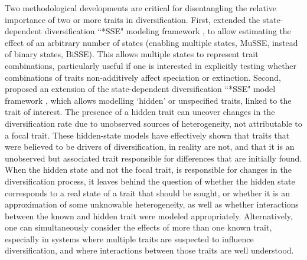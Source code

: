 Two methodological developments are critical for disentangling the relative importance of two or more traits in diversification.
First, \citet{fitzjohn_2012} extended the state-dependent diversification ``*SSE" modeling framework \citep{maddison2007}, to allow estimating the effect of an arbitrary number of states (enabling multiple states, MuSSE, instead of binary states, BiSSE).
This allows multiple states to represent trait combinations, particularly useful if one is interested in explicitly testing whether combinations of traits non-additively affect speciation or extinction.
Second, \citet{beaulieu_2016} proposed an extension of the state-dependent diversification ``*SSE" model framework \citep{maddison2007}, which allows modelling `hidden' or unspecified traits, linked to the trait of interest.
The presence of a hidden trait can uncover changes in the diversification rate due to unobserved sources of heterogeneity, not attributable to a focal trait.
These hidden-state  models have effectively shown that traits that were believed to be drivers of diversification, in reality are not, and that it is an unobserved but associated trait responsible for differences that are initially found. 
When the hidden state and not the focal trait, is responsible for changes in the diversification process, it leaves behind the question of whether the hidden state corresponds to a real state of a trait that should be sought, or whether it is an approximation of some unknowable heterogeneity, as well as whether interactions between the known and hidden trait were modeled appropriately.
Alternatively, one can simultaneously consider the effects of more than one known trait, especially in systems where multiple traits are suspected to influence diversification, and where interactions between those traits are well understood.

